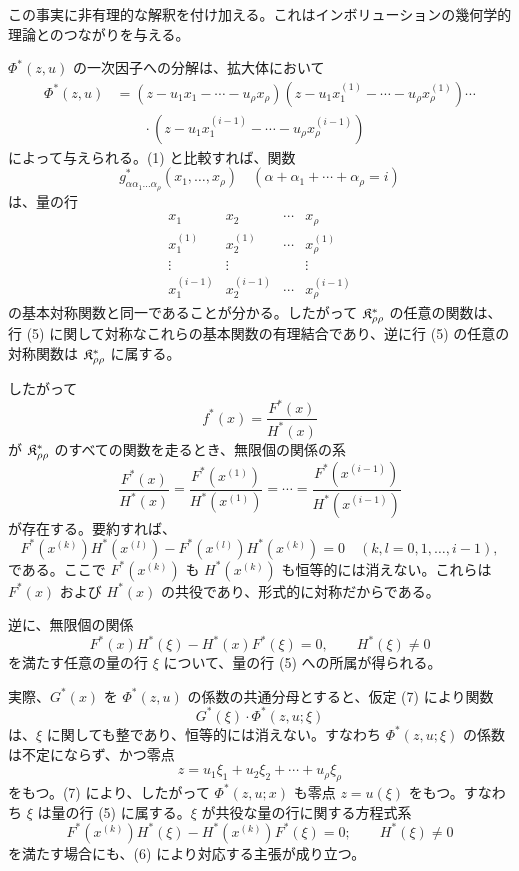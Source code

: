 \documentclass[11pt]{article}
\begin{document}
この事実に非有理的な解釈を付け加える。これはインボリューションの幾何学的理論とのつながりを与える。

$\Phi^*(z,u)$ の一次因子への分解は、拡大体において
\begin{equation}
\begin{aligned}
 \Phi^*(z,u)&=(z-u_1x_1-\cdots-u_\rho x_\rho)
 (z-u_1x_1^{(1)}-\cdots-u_\rho x_\rho^{(1)})\cdots\\
 &\qquad\cdot
 (z-u_1x_1^{(i-1)}-\cdots-u_\rho x_\rho^{(i-1)})
\end{aligned}
\tag{4}
\end{equation}
によって与えられる。(1) と比較すれば、関数
\[
  g^*_{\alpha\alpha_1\ldots\alpha_\rho}(x_1,
  \ldots,x_\rho)\quad(\alpha+\alpha_1+\cdots+\alpha_\rho=i)
\]
は、量の行
\begin{equation}
\begin{array}{cccc}
  x_1 & x_2 & \cdots & x_\rho\\
  x_1^{(1)} & x_2^{(1)} & \cdots & x_\rho^{(1)}\\
  \vdots & \vdots & & \vdots\\
  x_1^{(i-1)} & x_2^{(i-1)} & \cdots & x_\rho^{(i-1)}
\end{array}
\tag{5}
\end{equation}
の基本対称関数と同一であることが分かる。したがって $\mathfrak{K}^*_{\rho\rho}$ の任意の関数は、行 (5) に関して対称なこれらの基本関数の有理結合であり、逆に行 (5) の任意の対称関数は $\mathfrak{K}^*_{\rho\rho}$ に属する。

したがって
\[
  f^*(x)=\frac{F^*(x)}{H^*(x)}
\]
が $\mathfrak{K}^*_{\rho\rho}$ のすべての関数を走るとき、無限個の関係の系
\begin{equation}
  \frac{F^*(x)}{H^*(x)}=
  \frac{F^*(x^{(1)})}{H^*(x^{(1)})}=\cdots=
  \frac{F^*(x^{(i-1)})}{H^*(x^{(i-1)})}
\tag{6}
\end{equation}
が存在する。要約すれば、
\[
  F^*(x^{(k)})H^*(x^{(l)})-
  F^*(x^{(l)})H^*(x^{(k)})=0
  \quad(k,l=0,1,\ldots,i-1),
\]
である。ここで $F^*(x^{(k)})$ も $H^*(x^{(k)})$ も恒等的には消えない。これらは $F^*(x)$ および $H^*(x)$ の共役であり、形式的に対称だからである。

逆に、無限個の関係
\begin{equation}
  F^*(x)H^*(\xi)-H^*(x)F^*(\xi)=0,
  \qquad H^*(\xi)\ne0
\tag{7}
\end{equation}
を満たす任意の量の行 $\xi$ について、量の行 (5) への所属が得られる。

実際、$G^*(x)$ を $\Phi^*(z,u)$ の係数の共通分母とすると、仮定 (7) により関数
\[
  G^*(\xi)\cdot\Phi^*(z,u;\xi)
\]
は、$\xi$ に関しても整であり、恒等的には消えない。すなわち $\Phi^*(z,u;\xi)$ の係数は不定にならず、かつ零点
\[
  z=u_1\xi_1+u_2\xi_2+\cdots+u_\rho\xi_\rho
\]
をもつ。(7) により、したがって $\Phi^*(z,u;x)$ も零点 $z=u(\xi)$ をもつ。すなわち $\xi$ は量の行 (5) に属する。$\xi$ が共役な量の行に関する方程式系
\[
  F^*(x^{(k)})H^*(\xi)-H^*(x^{(k)})F^*(\xi)=0;
  \qquad H^*(\xi)\ne0
\]
を満たす場合にも、(6) により対応する主張が成り立つ。
\end{document}
